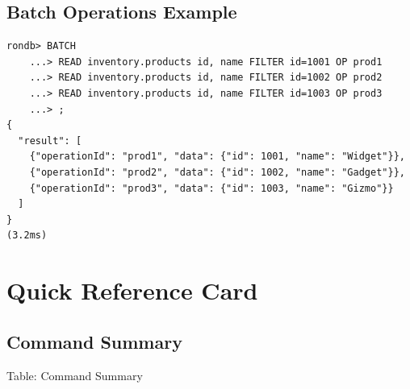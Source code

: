 \documentclass[11pt,a4paper]{report}
\begin{document}
\section{Batch Operations Example}

\begin{lstlisting}[language=rondb]
rondb> BATCH
    ...> READ inventory.products id, name FILTER id=1001 OP prod1
    ...> READ inventory.products id, name FILTER id=1002 OP prod2
    ...> READ inventory.products id, name FILTER id=1003 OP prod3
    ...> ;
{
  "result": [
    {"operationId": "prod1", "data": {"id": 1001, "name": "Widget"}},
    {"operationId": "prod2", "data": {"id": 1002, "name": "Gadget"}},
    {"operationId": "prod3", "data": {"id": 1003, "name": "Gizmo"}}
  ]
}
(3.2ms)
\end{lstlisting}

\appendix
\chapter{Quick Reference Card}

\section{Command Summary}

Table: Command Summary
\end{document}
